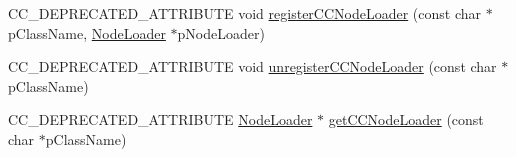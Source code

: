 \begin{DoxyCompactItemize}
C\+C\+\_\+\+D\+E\+P\+R\+E\+C\+A\+T\+E\+D\+\_\+\+A\+T\+T\+R\+I\+B\+U\+TE void \hyperlink{classcocosbuilder_1_1NodeLoaderLibrary_ab1085bafb54a6b274a0e2a1b692207d6}{register\+C\+C\+Node\+Loader} (const char $\ast$p\+Class\+Name, \hyperlink{classcocosbuilder_1_1NodeLoader}{Node\+Loader} $\ast$p\+Node\+Loader)
\item 
C\+C\+\_\+\+D\+E\+P\+R\+E\+C\+A\+T\+E\+D\+\_\+\+A\+T\+T\+R\+I\+B\+U\+TE void \hyperlink{classcocosbuilder_1_1NodeLoaderLibrary_a8d766eb2ce1a0bab766bb4572215beba}{unregister\+C\+C\+Node\+Loader} (const char $\ast$p\+Class\+Name)
\item 
C\+C\+\_\+\+D\+E\+P\+R\+E\+C\+A\+T\+E\+D\+\_\+\+A\+T\+T\+R\+I\+B\+U\+TE \hyperlink{classcocosbuilder_1_1NodeLoader}{Node\+Loader} $\ast$ \hyperlink{classcocosbuilder_1_1NodeLoaderLibrary_aff326fe273b58b025717fc379efd6bec}{get\+C\+C\+Node\+Loader} (const char $\ast$p\+Class\+Name)
\end{DoxyCompactItemize}
